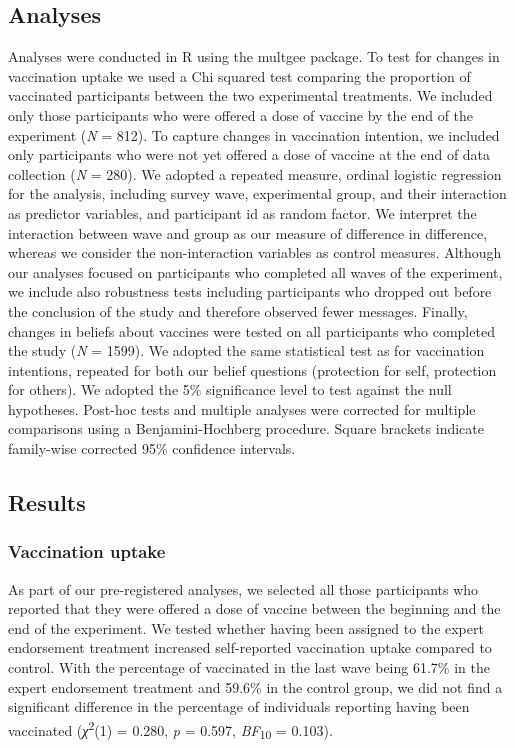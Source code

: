 \documentclass[authordate, empirical]{jote-new-article}
\begin{document}
	\subsection{Analyses}



	Analyses were conducted in R \parencites{RCore Team2018} using the multgee \parencites{Touloumis2013} package. To test for changes in vaccination uptake we used a Chi squared test comparing the proportion of vaccinated participants between the two experimental treatments. We included only those participants who were offered a dose of vaccine by the end of the experiment (\emph{N }= 812). To capture changes in vaccination intention, we included only participants who were not yet offered a dose of vaccine at the end of data collection (\emph{N }= 280). We adopted a repeated measure, ordinal logistic regression for the analysis, including survey wave, experimental group, and their interaction as predictor variables, and participant id as random factor. We interpret the interaction between wave and group as our measure of difference in difference, whereas we consider the non-interaction variables as control measures. Although our analyses focused on participants who completed all waves of the experiment, we include also robustness tests including participants who dropped out before the conclusion of the study and therefore observed fewer messages. Finally, changes in beliefs about vaccines were tested on all participants who completed the study (\emph{N }= 1599). We adopted the same statistical test as for vaccination intentions, repeated for both our belief questions (protection for self, protection for others). We adopted the 5\% significance level to test against the null hypotheses. Post-hoc tests and multiple analyses were corrected for multiple comparisons using a Benjamini-Hochberg procedure. Square brackets indicate family-wise corrected 95\% confidence intervals.



	\subsection{Results}



	\subsubsection{ Vaccination uptake}



	As part of our pre-registered analyses, we selected all those participants who reported that they were offered a dose of vaccine between the beginning and the end of the experiment. We tested whether having been assigned to the expert endorsement treatment increased self-reported vaccination uptake compared to control. With the percentage of vaccinated in the last wave being 61.7\% in the expert endorsement treatment and 59.6\% in the control group, we did not find a significant difference in the percentage of individuals reporting having been vaccinated (\emph{χ}\textsuperscript{2}(1) = 0.280, \emph{p }= 0.597, \emph{BF}\textsubscript{10 }= 0.103).
\end{document}
